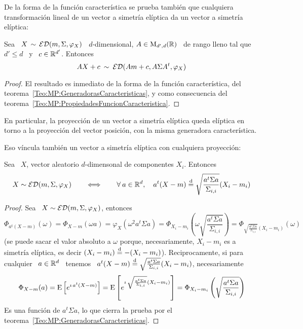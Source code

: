 De la  forma de la funci\'on  caracter\'istica se prueba  tambi\'en que cualquiera
transformaci\'on  lineal de un  vector a  simetr\'ia el\'iptica  da un  vector a
simetr\'ia el\'iptica:
%
\begin{teorema}
\label{Teo:MP:TransformacionAfinEliptica}
%
  Sea  \  $X \,  \sim  \,  \mathcal{ED}(m,\Sigma,\varphi_X)$  \ $d$-dimensional,  $A  \in
  \mathrm{M}_{d',d}(\mathbb{R})$  \ de  rango lleno  tal que  \ $d'  \le d$  \ y  \  $c \in
  \mathbb{R}^{d'}$. Entonces
  \[
  A X + c \: \sim \: \mathcal{ED}(A m + c , A \Sigma A^t , \varphi_X)
  \]
\end{teorema}
%
\begin{proof}
  El resultado  es inmediato de la  forma de la  funci\'on caracter\'istica, del
  teorema~\ref{Teo:MP:GeneradorasCaracteristicas},   y  como   consecuencia  del
  teorema~\ref{Teo:MP:PropiedadesFuncionCaracteristica}.
\end{proof}
%
En  particular, la  proyecci\'on  de  un vector  a  simetr\'ia el\'iptica  queda
el\'iptica  en torno  a  la proyecci\'on  del  vector posici\'on,  con la  misma
generadora caracter\'istica.


Eso  v\'incula  tambi\'en  un  vector  a  simetr\'ia  el\'iptica  con  cualquiera
proyecci\'on:
%
\begin{teorema}
\label{Teo:MP:ProyeccionComponentesEliptica}
%
  Sea \ $X$, vector aleatorio $d$-dimensonal de componentes $X_i$. Entonces
  \[
  X \sim \mathcal{ED}(m,\Sigma,\varphi_X) \qquad  \Longleftrightarrow \qquad \forall \: a
  \in \mathbb{R}^d, \quad a^t (X - m) \stackrel{\mathrm{d}}{=} \sqrt{\frac{a^t \Sigma a}{\Sigma_{i,i}}}
  (X_i - m_i)
  \]
\end{teorema}
%
\begin{proof}
  Sea \ $X \sim \mathcal{ED}(m,\Sigma,\varphi_X)$, entonces
  \[
  \Phi_{a^t (X - m)}(\omega) = \Phi_{X - m}(\omega a) = \varphi_X\left( \omega^2
    a^t \Sigma  a \right)  = \Phi_{X_i-m_i}\left( \omega  \sqrt{\frac{a^t \Sigma
        a}{\Sigma_{i,i}}}\right)       =       \Phi_{\sqrt{\frac{a^t      \Sigma
        a}{\Sigma_{i,i}}} (X_i-m_i)}\left( \omega \right)
  \]
  (se puede sacar el valor absoluto a $\omega$ porque, necesariamente, $X_i-m_i$
  es     a    simetr\'ia    el\'iptica,     es    decir     $(X_i-m_i)    \stackrel{\mathrm{d}}{=}
  -(X_i-m_i)$). Reciprocamente, si para cualquier  \ $a \in \mathbb{R}^d$ \ tenemos \
  $a^t (X  - m)  \stackrel{\mathrm{d}}{=} \sqrt{\frac{a^t \Sigma  a}{\Sigma_{i,i}}} (X_i  - m_i)$,
  necesariamente
  \[
  \Phi_{X  - m}(a) =  \operatorname{E}\left[ e^{\imath  \, a^t  (X-m)} \right]  = \operatorname{E}\left[
    e^{\imath \, \sqrt{\frac{a^t \Sigma a}{\Sigma_{i,i}}} (X_i - m_i)} \right] =
  \Phi_{X_i-m_i}\left( \sqrt{\frac{a^t \Sigma a}{\Sigma_{i,i}}}\right)
  \]
  Es  una  funci\'on  de  $a^t  \Sigma  a$,  lo que  cierra  la  prueba  por  el
  teorema~\ref{Teo:MP:GeneradorasCaracteristicas}.
\end{proof}

